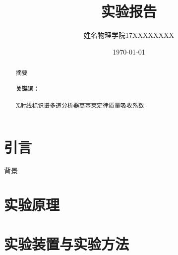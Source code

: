 \documentclass[a4paper,UTF8]{ctexart}
\title{实验报告}
\author{姓名\quad 物理学院\quad 17XXXXXXXX}
\date{\today}
\newcommand{\upcite}[1]{\textsuperscript{\textsuperscript{\cite{#1}}}}
\begin{document}
\maketitle

\begin{abstract}
    摘要
    \paragraph{关键词：} X射线标识谱\quad 多道分析器\quad 莫塞莱定律\quad 质量吸收系数

\end{abstract}

\section{引言}
背景 \upcite{textbook}


\section{实验原理}

\section{实验装置与实验方法}

\end{document}
